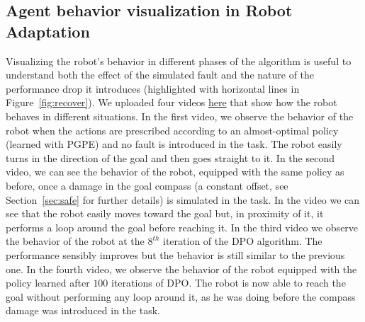 \subsection{Agent behavior visualization in Robot Adaptation}\label{sec:videos}
Visualizing the robot's behavior in different phases of the algorithm is useful to understand both the effect of the simulated fault and the nature of the performance drop it introduces (highlighted with horizontal lines in Figure~\ref{fig:recover}). We uploaded four videos \href{https://www.youtube.com/playlist?list=PLT0QhH0oHUgVWxikBgc9be78LCNgyqlWO}{here} that show how the robot behaves in different situations. In the first video, we observe the behavior of the robot when the actions are prescribed according to an almost-optimal policy (learned with \ac{PGPE}) and no fault is introduced in the task. The robot easily turns in the direction of the goal and then goes straight to it. In the second video, we can see the behavior of the robot, equipped with the same policy as before, once a damage in the goal compass (a constant offset, see Section~\ref{sec:safe} for further details) is simulated in the task. In the video we can see that the robot easily moves toward the goal but, in proximity of it, it performs a loop around the goal before reaching it. In the third video we observe the behavior of the robot at the $8^{th}$ iteration of the \ac{DPO} algorithm. The performance sensibly improves but the behavior is still similar to the previous one. In the fourth video, we observe the behavior of the robot equipped with the policy learned after $100$ iterations of \ac{DPO}. The robot is now able to reach the goal without performing any loop around it, as he was doing before the compass damage was introduced in the task.

